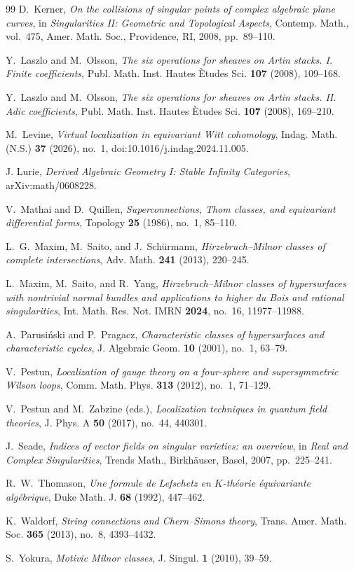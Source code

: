 \documentclass[10pt,a4paper,dvipsnames,x11names]{amsart}
\numberwithin{equation}{section}
\theoremstyle{plain}
\theoremstyle{definition}
\theoremstyle{remark}
\begin{document}
\begin{thebibliography}{99}
D.~Kerner,
\emph{On the collisions of singular points of complex algebraic plane curves},
in \emph{Singularities II: Geometric and Topological Aspects},
Contemp. Math., vol.~475, Amer. Math. Soc., Providence, RI, 2008, pp.~89--110.

Y.~Laszlo and M.~Olsson,
\emph{The six operations for sheaves on Artin stacks. I. Finite coefficients},
Publ. Math. Inst. Hautes \`Etudes Sci. \textbf{107} (2008), 109--168.

Y.~Laszlo and M.~Olsson,
\emph{The six operations for sheaves on Artin stacks. II. Adic coefficients},
Publ. Math. Inst. Hautes \`Etudes Sci. \textbf{107} (2008), 169--210.

M.~Levine,
\emph{Virtual localization in equivariant Witt cohomology},
Indag. Math. (N.S.) \textbf{37} (2026), no.~1,
doi:10.1016/j.indag.2024.11.005.

J. Lurie,
\emph{Derived Algebraic Geometry I: Stable Infinity Categories},
arXiv:math/0608228.

V.~Mathai and D.~Quillen,
\emph{Superconnections, Thom classes, and equivariant differential forms},
Topology \textbf{25} (1986), no.~1, 85--110.

L.~G.~Maxim, M.~Saito, and J.~Sch\"urmann,
\emph{Hirzebruch--Milnor classes of complete intersections},
Adv. Math. \textbf{241} (2013), 220--245.

L.~Maxim, M.~Saito, and R.~Yang,
\emph{Hirzebruch--Milnor classes of hypersurfaces with nontrivial normal bundles and applications to higher du Bois and rational singularities},
Int. Math. Res. Not. IMRN \textbf{2024}, no.~16, 11977--11988.


A.~Parusi\'nski and P.~Pragacz,
\emph{Characteristic classes of hypersurfaces and characteristic cycles},
J. Algebraic Geom. \textbf{10} (2001), no.~1, 63--79.

V.~Pestun,
\emph{Localization of gauge theory on a four-sphere and supersymmetric Wilson loops},
Comm. Math. Phys. \textbf{313} (2012), no.~1, 71--129.

V.~Pestun and M.~Zabzine (eds.),
\emph{Localization techniques in quantum field theories},
J. Phys. A \textbf{50} (2017), no.~44, 440301.


J.~Seade,
\emph{Indices of vector fields on singular varieties: an overview},
in \emph{Real and Complex Singularities}, Trends Math., Birkh\"auser, Basel, 2007, pp.~225--241.

R.~W.~Thomason,
\emph{Une formule de Lefschetz en $K$-th\'eorie \'equivariante alg\'ebrique},
Duke Math. J. \textbf{68} (1992), 447--462.


K.~Waldorf,
\emph{String connections and Chern--Simons theory},
Trans. Amer. Math. Soc. \textbf{365} (2013), no.~8, 4393--4432.

S.~Yokura,
\emph{Motivic Milnor classes},
J. Singul. \textbf{1} (2010), 39--59.

\end{thebibliography}
\end{document}

